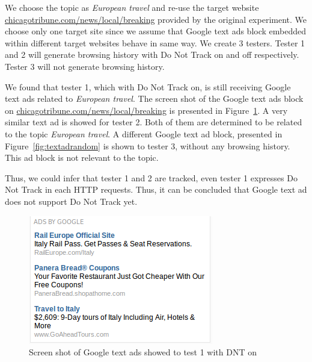 \documentclass{sig-alternate}
\begin{document}
We choose the topic as \emph{European travel} and re-use the target website \url{chicagotribune.com/news/local/breaking} provided by the original experiment. We choose only one target site since we assume that Google text ads block embedded within different target websites behave in same way. We create 3 testers. Tester 1 and 2 will generate browsing history with Do Not Track on and off respectively. Tester 3 will not generate browsing history.

We found that tester 1, which with Do Not Track on, is still receiving Google text ads related to \emph{European travel}. The screen shot of the Google text ads block on \url{chicagotribune.com/news/local/breaking} is presented in Figure~\ref{fig:textad}. A very similar text ad is showed for tester 2. Both of them are determined to be related to the topic \emph{European travel}. A different Google text ad block, presented in Figure~\ref{fig:textadrandom} is shown to tester 3, without any browsing history. This ad block is not relevant to the topic.

Thus, we could infer that tester 1 and 2 are tracked, even tester 1 expresses Do Not Track in each HTTP requests. Thus, it can be concluded that Google text ad does not support Do Not Track yet.
\begin{figure}
\begin{center}
\includegraphics[width=0.9\columnwidth]{textad}
\end{center}
\caption{Screen shot of Google text ads showed to test 1 with DNT on}
\label{fig:textad}
\end{figure}
\end{document}
